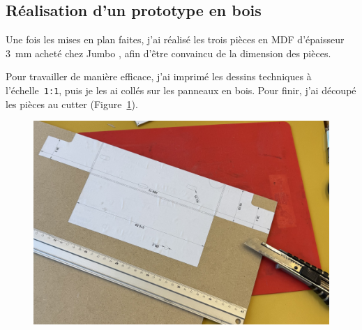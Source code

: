 \begin{minipage}[c]{0.48\textwidth}
    \subsection{Réalisation d'un prototype en bois} \label{prototype_bois}
    Une fois les mises en plan faites, j'ai réalisé les trois pièces en MDF d'épaisseur 3~mm acheté chez Jumbo \cite{mdfJumbo}, afin d'être convaincu de la dimension des pièces.

    Pour travailler de manière efficace, j'ai imprimé les dessins techniques à l'échelle~\texttt{1:1}, puis je les ai collés sur les panneaux en bois. Pour finir, j'ai découpé les pièces au cutter (Figure~\ref{decoupe_bois}).
    \vspace{1em}
\end{minipage}\hfill
\begin{minipage}[c]{0.48\textwidth}
    \begin{figure}[H]
        \centering
        \includegraphics[width=\textwidth]{assets/figures/Protections_laser/Securite_mecanique/Protection_entree_laser/decoupe_bois.jpeg}
        \label{decoupe_bois}
    \end{figure}
\end{minipage}


